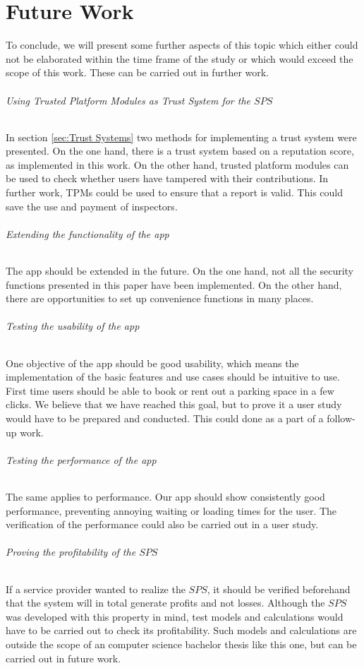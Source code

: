 \chapter{Future Work}
\label{ch:Future Work}
To conclude, we will present some further aspects of this topic which either could not be elaborated within the time frame of the study or which would exceed the scope of this work. These can be carried out in further work.

\subparagraph{Using Trusted Platform Modules as Trust System for the $SPS$}
In section \ref{sec:Trust Systems} two methods for implementing a trust system were presented. On the one hand, there is a trust system based on a reputation score, as implemented in this work. On the other hand, trusted platform modules can be used to check whether users have tampered with their contributions. In further work, TPMs could be used to ensure that a report is valid. This could save the use and payment of inspectors.
\subparagraph{Extending the functionality of the app}
The app should be extended in the future. On the one hand, not all the security functions presented in this paper have been implemented. On the other hand, there are opportunities to set up convenience functions in many places.
\subparagraph{Testing the usability of the app}
One objective of the app should be good usability, which means the implementation of the basic features and use cases should be intuitive to use. First time users should be able to book or rent out a parking space in a few clicks. We believe that we have reached this goal, but to prove it a user study would have to be prepared and conducted. This could done as a part of a follow-up work.
\subparagraph{Testing the performance of the app}
The same applies to performance. Our app should show consistently good performance, preventing annoying waiting or loading times for the user. The verification of the performance could also be carried out in a user study.
\subparagraph{Proving the profitability of the $SPS$}
If a service provider wanted to realize the $SPS$, it should be verified beforehand that the system will in total generate profits and not losses. Although the $SPS$ was developed with this property in mind, test models and calculations would have to be carried out to check its profitability. Such models and calculations are outside the scope of an computer science bachelor thesis like this one, but can be carried out in future work.
